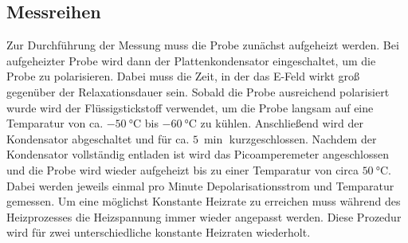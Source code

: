 \subsection{Messreihen}
Zur Durchführung der Messung muss die Probe zunächst aufgeheizt werden. Bei aufgeheizter Probe wird dann der Plattenkondensator eingeschaltet, um die Probe zu polarisieren. 
Dabei muss die Zeit, in der das E-Feld wirkt groß gegenüber der Relaxationsdauer sein. 
Sobald die Probe ausreichend polarisiert wurde wird der Flüssigstickstoff verwendet, um die Probe langsam auf eine Temparatur von ca. $\SI{-50}{\celsius}$ bis $\SI{-60}{\celsius}$ zu kühlen. 
Anschließend wird der Kondensator abgeschaltet und für ca. $\SI{5}{\min}$ kurzgeschlossen. 
Nachdem der Kondensator vollständig entladen ist wird das Picoamperemeter angeschlossen und die Probe wird wieder aufgeheizt bis zu einer Temparatur von circa $\SI{50}{\celsius}$. 
Dabei werden jeweils einmal pro Minute Depolarisationsstrom und Temparatur gemessen. Um eine möglichst Konstante Heizrate zu erreichen muss während des Heizprozesses die Heizspannung immer wieder angepasst werden. 
Diese Prozedur wird für zwei unterschiedliche konstante Heizraten wiederholt.